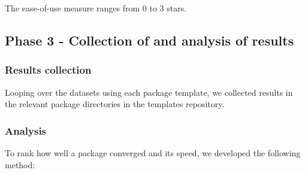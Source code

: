 The ease-of-use measure ranges from 0 to 3 stars.

\hypertarget{phase-3---collection-of-and-analysis-of-results}{%
\subsection{Phase 3 - Collection of and analysis of
results}\label{phase-3---collection-of-and-analysis-of-results}}

\hypertarget{results-collection}{%
\subsubsection{Results collection}\label{results-collection}}

Looping over the datasets using each package template, we collected
results in the relevant package directories in the templates repository.

\hypertarget{analysis}{%
\subsubsection{Analysis}\label{analysis}}

To rank how well a package converged and its speed, we developed the
following method:

